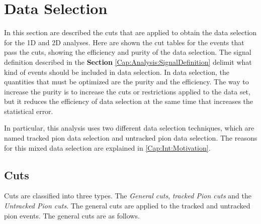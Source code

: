 \section{Data Selection}
\label{Cap:Analysis:DataSelection}

In this section are described the cuts that are applied to obtain the data selection for the 1D and 2D analyses. Here are shown the cut tables for the events that pass the cuts, showing the efficiency and purity of the data selection. The signal definition described in the \textbf{Section} \ref{Cap:Analysis:SignalDefinition} delimit what kind of events should be included in data selection. In data selection, the quantities that must be optimized are the purity and the efficiency. The way to increase the purity is to increase the cuts or restrictions applied to the data set, but it reduces the efficiency of data selection at the same time that increases the statistical error. 

In particular, this analysis uses two different data selection techniques, which are named tracked pion data selection and untracked pion data selection. The reasons for this mixed data selection are explained in \ref{Cap:Int:Motivation}.


\subsection{Cuts}
\label{Cap:Analysis:DataSelection:Cuts}

Cuts are classified into three types. The \textit{General cuts}, \textit{tracked Pion cuts} and the \textit{Untracked Pion cuts}. The general cuts are applied to the tracked and untracked pion events. The general cuts are as follows.

